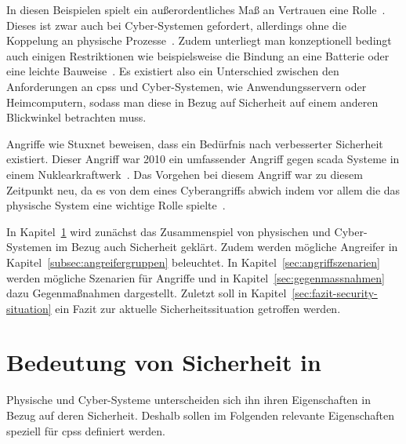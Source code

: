 \documentclass[final,bibliography=totocnumbered]{include/sikseminar}
\newcommand{\cps}{\glspl{cps}\xspace}
\begin{document}
    In diesen Beispielen spielt ein außerordentliches Maß an Vertrauen eine Rolle~\cite{SGL+08}.
    Dieses ist zwar auch bei Cyber-Systemen gefordert, allerdings ohne die Koppelung an physische Prozesse~\cite{BG11}.
    Zudem unterliegt man konzeptionell bedingt auch einigen Restriktionen wie beispielsweise die Bindung an eine Batterie oder eine leichte Bauweise~\cite{YWY+17}.
    Es existiert also ein Unterschied zwischen den Anforderungen an \cps und Cyber-Systemen, wie Anwendungsservern oder Heimcomputern, sodass man diese in Bezug auf Sicherheit auf einem anderen Blickwinkel betrachten muss.

    Angriffe wie Stuxnet beweisen, dass ein Bedürfnis nach verbesserter Sicherheit existiert.
    Dieser Angriff war 2010 ein umfassender Angriff gegen \gls{scada} Systeme in einem Nuklearkraftwerk~\cite{Langner11}.
    Das Vorgehen bei diesem Angriff war zu diesem Zeitpunkt neu, da es von dem eines Cyberangriffs abwich indem vor allem die das physische System eine wichtige Rolle spielte~\cite{Langner11}.

    In Kapitel~\ref{sec:bedeutung-sicherheit} wird zunächst das Zusammenspiel von physischen und Cyber-Systemen im Bezug auch Sicherheit geklärt.
    Zudem werden mögliche Angreifer in Kapitel~\ref{subsec:angreifergruppen} beleuchtet.
    In Kapitel~\ref{sec:angriffszenarien} werden mögliche Szenarien für Angriffe und in Kapitel~\ref{sec:gegenmassnahmen} dazu Gegenmaßnahmen dargestellt.
    Zuletzt soll in Kapitel~\ref{sec:fazit-security-situation} ein Fazit zur aktuelle Sicherheitssituation getroffen werden.

    \section{Bedeutung von Sicherheit in }
    \label{sec:bedeutung-sicherheit}

    Physische und Cyber-Systeme unterscheiden sich ihn ihren Eigenschaften in Bezug auf deren Sicherheit.
    Deshalb sollen im Folgenden relevante Eigenschaften speziell für \cps definiert werden.
\end{document}

